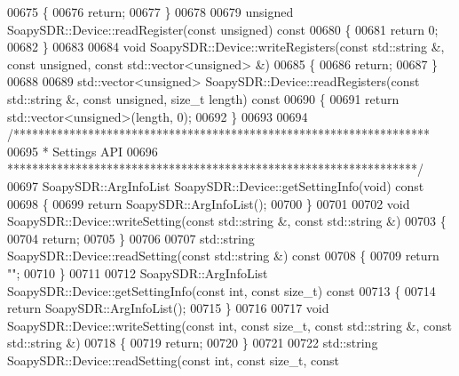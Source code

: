 \begin{DoxyCode}
00675 \{
00676     \textcolor{keywordflow}{return};
00677 \}
00678 
00679 \textcolor{keywordtype}{unsigned} SoapySDR::Device::readRegister(\textcolor{keyword}{const} \textcolor{keywordtype}{unsigned})\textcolor{keyword}{ const}
00680 \textcolor{keyword}{}\{
00681     \textcolor{keywordflow}{return} 0;
00682 \}
00683 
00684 \textcolor{keywordtype}{void} SoapySDR::Device::writeRegisters(\textcolor{keyword}{const} std::string &, \textcolor{keyword}{const} \textcolor{keywordtype}{unsigned}, \textcolor{keyword}{const} std::vector<unsigned> &)
00685 \{
00686     \textcolor{keywordflow}{return};
00687 \}
00688 
00689 std::vector<unsigned> SoapySDR::Device::readRegisters(\textcolor{keyword}{const} std::string &, \textcolor{keyword}{const} \textcolor{keywordtype}{unsigned}, \textcolor{keywordtype}{size\_t} 
      length)\textcolor{keyword}{ const}
00690 \textcolor{keyword}{}\{
00691     \textcolor{keywordflow}{return} std::vector<unsigned>(length, 0);
00692 \}
00693 
00694 \textcolor{comment}{/*******************************************************************}
00695 \textcolor{comment}{ * Settings API}
00696 \textcolor{comment}{ ******************************************************************/}
00697 SoapySDR::ArgInfoList SoapySDR::Device::getSettingInfo(\textcolor{keywordtype}{void})\textcolor{keyword}{ const}
00698 \textcolor{keyword}{}\{
00699     \textcolor{keywordflow}{return} SoapySDR::ArgInfoList();
00700 \}
00701 
00702 \textcolor{keywordtype}{void} SoapySDR::Device::writeSetting(\textcolor{keyword}{const} std::string &, \textcolor{keyword}{const} std::string &)
00703 \{
00704     \textcolor{keywordflow}{return};
00705 \}
00706 
00707 std::string SoapySDR::Device::readSetting(\textcolor{keyword}{const} std::string &)\textcolor{keyword}{ const}
00708 \textcolor{keyword}{}\{
00709     \textcolor{keywordflow}{return} \textcolor{stringliteral}{""};
00710 \}
00711 
00712 SoapySDR::ArgInfoList SoapySDR::Device::getSettingInfo(\textcolor{keyword}{const} \textcolor{keywordtype}{int}, \textcolor{keyword}{const} \textcolor{keywordtype}{size\_t})\textcolor{keyword}{ const}
00713 \textcolor{keyword}{}\{
00714     \textcolor{keywordflow}{return} SoapySDR::ArgInfoList();
00715 \}
00716 
00717 \textcolor{keywordtype}{void} SoapySDR::Device::writeSetting(\textcolor{keyword}{const} \textcolor{keywordtype}{int}, \textcolor{keyword}{const} \textcolor{keywordtype}{size\_t}, \textcolor{keyword}{const} std::string &, \textcolor{keyword}{const} 
      std::string &)
00718 \{
00719     \textcolor{keywordflow}{return};
00720 \}
00721 
00722 std::string SoapySDR::Device::readSetting(\textcolor{keyword}{const} \textcolor{keywordtype}{int}, \textcolor{keyword}{const} \textcolor{keywordtype}{size\_t}, \textcolor{keyword}{const} 

\end{DoxyCode}
